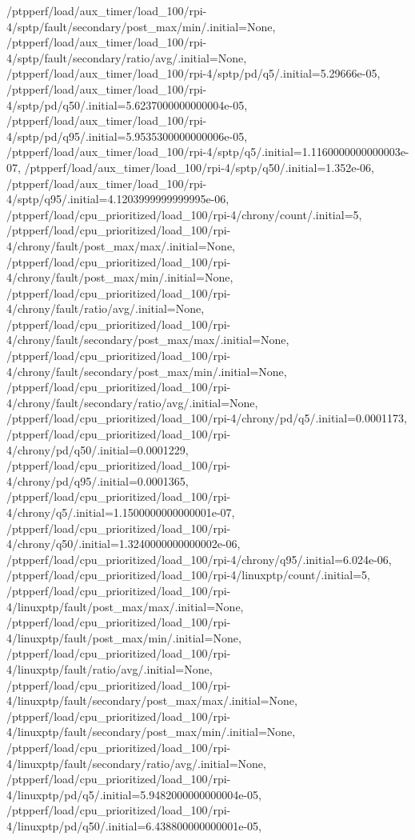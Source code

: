 {    /ptpperf/load/aux_timer/load_100/rpi-4/sptp/fault/secondary/post_max/min/.initial=None,
    /ptpperf/load/aux_timer/load_100/rpi-4/sptp/fault/secondary/ratio/avg/.initial=None,
    /ptpperf/load/aux_timer/load_100/rpi-4/sptp/pd/q5/.initial=5.29666e-05,
    /ptpperf/load/aux_timer/load_100/rpi-4/sptp/pd/q50/.initial=5.6237000000000004e-05,
    /ptpperf/load/aux_timer/load_100/rpi-4/sptp/pd/q95/.initial=5.9535300000000006e-05,
    /ptpperf/load/aux_timer/load_100/rpi-4/sptp/q5/.initial=1.1160000000000003e-07,
    /ptpperf/load/aux_timer/load_100/rpi-4/sptp/q50/.initial=1.352e-06,
    /ptpperf/load/aux_timer/load_100/rpi-4/sptp/q95/.initial=4.1203999999999995e-06,
    /ptpperf/load/cpu_prioritized/load_100/rpi-4/chrony/count/.initial=5,
    /ptpperf/load/cpu_prioritized/load_100/rpi-4/chrony/fault/post_max/max/.initial=None,
    /ptpperf/load/cpu_prioritized/load_100/rpi-4/chrony/fault/post_max/min/.initial=None,
    /ptpperf/load/cpu_prioritized/load_100/rpi-4/chrony/fault/ratio/avg/.initial=None,
    /ptpperf/load/cpu_prioritized/load_100/rpi-4/chrony/fault/secondary/post_max/max/.initial=None,
    /ptpperf/load/cpu_prioritized/load_100/rpi-4/chrony/fault/secondary/post_max/min/.initial=None,
    /ptpperf/load/cpu_prioritized/load_100/rpi-4/chrony/fault/secondary/ratio/avg/.initial=None,
    /ptpperf/load/cpu_prioritized/load_100/rpi-4/chrony/pd/q5/.initial=0.0001173,
    /ptpperf/load/cpu_prioritized/load_100/rpi-4/chrony/pd/q50/.initial=0.0001229,
    /ptpperf/load/cpu_prioritized/load_100/rpi-4/chrony/pd/q95/.initial=0.0001365,
    /ptpperf/load/cpu_prioritized/load_100/rpi-4/chrony/q5/.initial=1.1500000000000001e-07,
    /ptpperf/load/cpu_prioritized/load_100/rpi-4/chrony/q50/.initial=1.3240000000000002e-06,
    /ptpperf/load/cpu_prioritized/load_100/rpi-4/chrony/q95/.initial=6.024e-06,
    /ptpperf/load/cpu_prioritized/load_100/rpi-4/linuxptp/count/.initial=5,
    /ptpperf/load/cpu_prioritized/load_100/rpi-4/linuxptp/fault/post_max/max/.initial=None,
    /ptpperf/load/cpu_prioritized/load_100/rpi-4/linuxptp/fault/post_max/min/.initial=None,
    /ptpperf/load/cpu_prioritized/load_100/rpi-4/linuxptp/fault/ratio/avg/.initial=None,
    /ptpperf/load/cpu_prioritized/load_100/rpi-4/linuxptp/fault/secondary/post_max/max/.initial=None,
    /ptpperf/load/cpu_prioritized/load_100/rpi-4/linuxptp/fault/secondary/post_max/min/.initial=None,
    /ptpperf/load/cpu_prioritized/load_100/rpi-4/linuxptp/fault/secondary/ratio/avg/.initial=None,
    /ptpperf/load/cpu_prioritized/load_100/rpi-4/linuxptp/pd/q5/.initial=5.9482000000000004e-05,
    /ptpperf/load/cpu_prioritized/load_100/rpi-4/linuxptp/pd/q50/.initial=6.438800000000001e-05,
}

